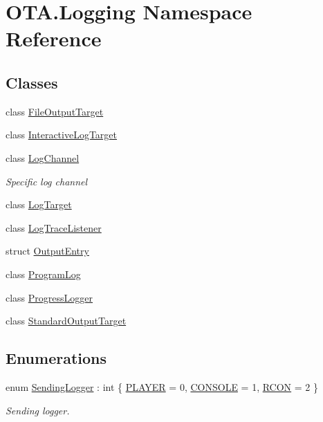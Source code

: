 \hypertarget{namespaceOTA_1_1Logging}{}\section{O\+T\+A.\+Logging Namespace Reference}
\label{namespaceOTA_1_1Logging}
\subsection*{Classes}
\begin{DoxyCompactItemize}
\item 
class \hyperlink{classOTA_1_1Logging_1_1FileOutputTarget}{File\+Output\+Target}
\item 
class \hyperlink{classOTA_1_1Logging_1_1InteractiveLogTarget}{Interactive\+Log\+Target}
\item 
class \hyperlink{classOTA_1_1Logging_1_1LogChannel}{Log\+Channel}
\begin{DoxyCompactList}\small\item\em Specific log channel \end{DoxyCompactList}\item 
class \hyperlink{classOTA_1_1Logging_1_1LogTarget}{Log\+Target}
\item 
class \hyperlink{classOTA_1_1Logging_1_1LogTraceListener}{Log\+Trace\+Listener}
\item 
struct \hyperlink{structOTA_1_1Logging_1_1OutputEntry}{Output\+Entry}
\item 
class \hyperlink{classOTA_1_1Logging_1_1ProgramLog}{Program\+Log}
\item 
class \hyperlink{classOTA_1_1Logging_1_1ProgressLogger}{Progress\+Logger}
\item 
class \hyperlink{classOTA_1_1Logging_1_1StandardOutputTarget}{Standard\+Output\+Target}
\end{DoxyCompactItemize}
\subsection*{Enumerations}
\begin{DoxyCompactItemize}
\item 
enum \hyperlink{namespaceOTA_1_1Logging_a489c780cb72d9452216c06b7a0eec2a6}{Sending\+Logger} \+: int \{ \hyperlink{namespaceOTA_1_1Logging_a489c780cb72d9452216c06b7a0eec2a6a07c80e2a355d91402a00d82b1fa13855}{P\+L\+A\+Y\+E\+R} = 0, 
\hyperlink{namespaceOTA_1_1Logging_a489c780cb72d9452216c06b7a0eec2a6a4695859f52d337ca3d7020b2c8f7882a}{C\+O\+N\+S\+O\+L\+E} = 1, 
\hyperlink{namespaceOTA_1_1Logging_a489c780cb72d9452216c06b7a0eec2a6af2d3ec013c88e111064483739a50a7f4}{R\+C\+O\+N} = 2
 \}\begin{DoxyCompactList}\small\item\em Sending logger. \end{DoxyCompactList}
\end{DoxyCompactItemize}


